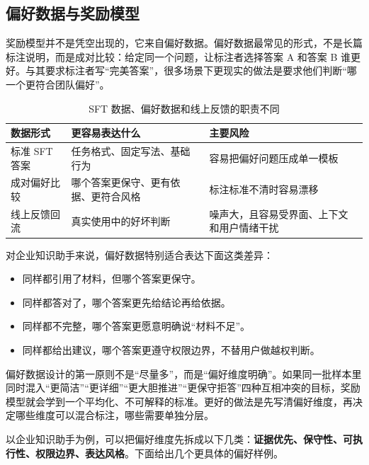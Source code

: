 \subsection{偏好数据与奖励模型}
奖励模型并不是凭空出现的，它来自偏好数据。偏好数据最常见的形式，不是长篇标注说明，而是成对比较：给定同一个问题，让标注者选择答案 A 和答案 B 谁更好。与其要求标注者写“完美答案”，很多场景下更现实的做法是要求他们判断“哪一个更符合团队偏好”。

\begin{table}[H]
\centering
\small
\begin{tabularx}{\textwidth}{>{\raggedright\arraybackslash}p{3cm}>{\raggedright\arraybackslash}p{3.6cm}>{\raggedright\arraybackslash}X}
\toprule
\textbf{数据形式} & \textbf{更容易表达什么} & \textbf{主要风险} \\
\midrule
标准 SFT 答案 & 任务格式、固定写法、基础行为 & 容易把偏好问题压成单一模板 \\
成对偏好比较 & 哪个答案更保守、更有依据、更符合风格 & 标注标准不清时容易漂移 \\
线上反馈回流 & 真实使用中的好坏判断 & 噪声大，且容易受界面、上下文和用户情绪干扰 \\
\bottomrule
\end{tabularx}
\caption{SFT 数据、偏好数据和线上反馈的职责不同}
\label{tab:preference-data-types}
\end{table}

对企业知识助手来说，偏好数据特别适合表达下面这类差异：
\begin{itemize}
  \item 同样都引用了材料，但哪个答案更保守。
  \item 同样都答对了，哪个答案更先给结论再给依据。
  \item 同样都不完整，哪个答案更愿意明确说“材料不足”。
  \item 同样都给出建议，哪个答案更遵守权限边界，不替用户做越权判断。
\end{itemize}

偏好数据设计的第一原则不是“尽量多”，而是“偏好维度明确”。如果同一批样本里同时混入“更简洁”“更详细”“更大胆推进”“更保守拒答”四种互相冲突的目标，奖励模型就会学到一个平均化、不可解释的标准。更好的做法是先写清偏好维度，再决定哪些维度可以混合标注，哪些需要单独分层。

以企业知识助手为例，可以把偏好维度先拆成以下几类：\textbf{证据优先、保守性、可执行性、权限边界、表达风格}。下面给出几个更具体的偏好样例。


